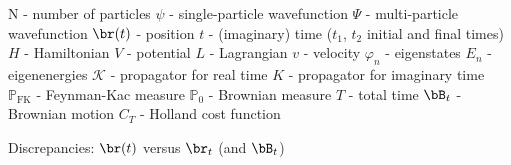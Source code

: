 N - number of particles
$\psi$ - single-particle wavefunction
$\Psi$ - multi-particle wavefunction
$\br(t)$ - position
$t$ - (imaginary) time ($t_1$, $t_2$ initial and final times)
$H$ - Hamiltonian
$V$ - potential
$L$ - Lagrangian
$v$ - velocity
$\varphi_n$ - eigenstates
$E_n$ - eigenenergies
$\mathcal{K}$ - propagator for real time
$K$ - propagator for imaginary time
$\mathbb{P}_\text{FK}$ - Feynman-Kac measure
$\mathbb{P}_0$ - Brownian measure
$T$ - total time
$\bB_t$ - Brownian motion
$C_T$ - Holland cost function

Discrepancies:
$\br(t)$ versus $\br_t$ (and $\bB_t$)
